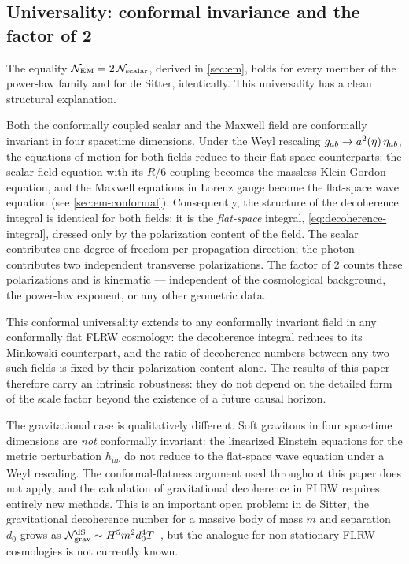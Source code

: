 \subsection{Universality: conformal invariance and the factor of 2}
\label{sec:discussion-universality}

The equality $\mathcal{N}_{\rm EM} = 2\,\mathcal{N}_{\rm scalar}$, derived in \cref{sec:em},
holds for every member of the power-law family and for de Sitter, identically.
This universality has a clean structural explanation.

Both the conformally coupled scalar and the Maxwell field are conformally
invariant in four spacetime dimensions.  Under the Weyl rescaling
$g_{ab} \to a^2(\eta)\,\eta_{ab}$, the equations of motion for both fields
reduce to their flat-space counterparts: the scalar field equation with its
$R/6$ coupling becomes the massless Klein-Gordon equation, and the Maxwell
equations in Lorenz gauge become the flat-space wave equation (see
\cref{sec:em-conformal}).  Consequently, the structure of the decoherence
integral is identical for both fields: it is the \emph{flat-space} integral,
\cref{eq:decoherence-integral}, dressed only by the polarization content of the
field.  The scalar contributes one degree of freedom per propagation direction;
the photon contributes two independent transverse polarizations.  The factor of 2
counts these polarizations and is kinematic — independent of the cosmological
background, the power-law exponent, or any other geometric data.

This conformal universality extends to any conformally invariant field in any
conformally flat FLRW cosmology: the decoherence integral reduces to its Minkowski
counterpart, and the ratio of decoherence numbers between any two such fields is
fixed by their polarization content alone.  The results of this paper therefore
carry an intrinsic robustness: they do not depend on the detailed form of the
scale factor beyond the existence of a future causal horizon.

The gravitational case is qualitatively different.  Soft gravitons in four
spacetime dimensions are \emph{not} conformally invariant: the linearized
Einstein equations for the metric perturbation $h_{\mu\nu}$ do not reduce to
the flat-space wave equation under a Weyl rescaling.  The conformal-flatness
argument used throughout this paper does not apply, and the calculation of
gravitational decoherence in FLRW requires entirely new methods.  This is an
important open problem: in de Sitter, the gravitational decoherence number for
a massive body of mass $m$ and separation $d_0$ grows as
$\mathcal{N}_{\rm grav}^{\rm dS} \sim H^5 m^2 d_0^4 T$~\cite{Danielson:2022tdw},
but the analogue for non-stationary FLRW cosmologies is not currently known.

